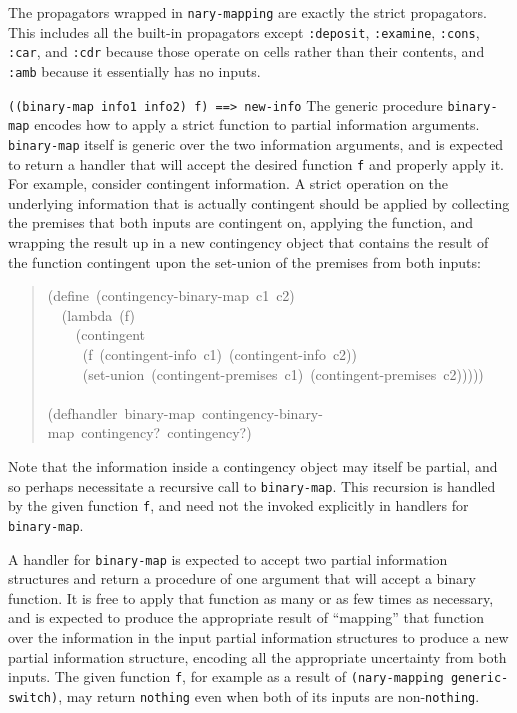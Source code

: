 \documentclass[12pt,letterpaper,english]{article}
\begin{document}
The propagators wrapped in \texttt{nary-mapping} are exactly the strict
propagators.  This includes all the built-in propagators except
\texttt{:deposit}, \texttt{:examine}, \texttt{:cons}, \texttt{:car}, and \texttt{:cdr} because
those operate on cells rather than their contents, and \texttt{:amb}
because it essentially has no inputs.

\texttt{((binary-map info1 info2) f)  ==>  new-info}
The generic procedure \texttt{binary-map} encodes how to apply a strict
function to partial information arguments.  \texttt{binary-map} itself is
generic over the two information arguments, and is expected to return
a handler that will accept the desired function \texttt{f} and properly
apply it.  For example, consider contingent information.  A strict
operation on the underlying information that is actually contingent
should be applied by collecting the premises that both inputs are
contingent on, applying the function, and wrapping the result up in a
new contingency object that contains the result of the function
contingent upon the set-union of the premises from both inputs:
\begin{quote}{\ttfamily \raggedright \noindent
(define~(contingency-binary-map~c1~c2)~\\
~~(lambda~(f)~\\
~~~~(contingent~\\
~~~~~(f~(contingent-info~c1)~(contingent-info~c2))~\\
~~~~~(set-union~(contingent-premises~c1)~(contingent-premises~c2)))))~\\
~\\
(defhandler~binary-map~contingency-binary-map~contingency?~contingency?)
}\end{quote}

Note that the information inside a contingency object may itself be
partial, and so perhaps necessitate a recursive call to
\texttt{binary-map}.  This recursion is handled by the given function
\texttt{f}, and need not the invoked explicitly in handlers for
\texttt{binary-map}.

A handler for \texttt{binary-map} is expected to accept two partial
information structures and return a procedure of one argument that
will accept a binary function.  It is free to apply that function as
many or as few times as necessary, and is expected to produce the
appropriate result of ``mapping'' that function over the information in
the input partial information structures to produce a new partial
information structure, encoding all the appropriate uncertainty from
both inputs.  The given function \texttt{f}, for example as a result of
\texttt{(nary-mapping generic-switch)}, may return \texttt{nothing} even when
both of its inputs are non-\texttt{nothing}.
\end{document}
